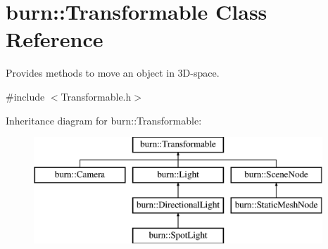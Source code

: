 \hypertarget{classburn_1_1_transformable}{\section{burn\-:\-:Transformable Class Reference}
\label{classburn_1_1_transformable}
}


Provides methods to move an object in 3\-D-\/space.  




{\ttfamily \#include $<$Transformable.\-h$>$}

Inheritance diagram for burn\-:\-:Transformable\-:\begin{figure}[H]
\begin{center}
\leavevmode
\includegraphics[height=4.000000cm]{classburn_1_1_transformable}
\end{center}
\end{figure}
